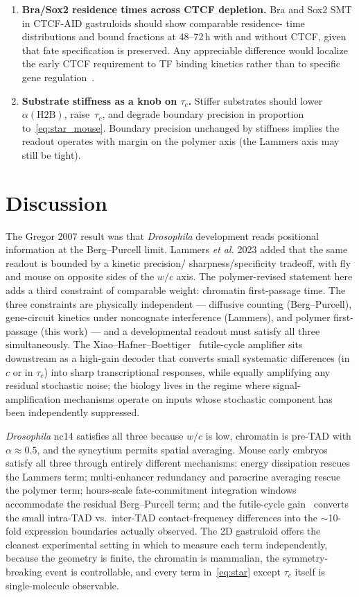 \documentclass[11pt]{article}
\begin{document}
\begin{enumerate}
  \item \textbf{Bra/Sox2 residence times across CTCF depletion.} Bra and
        Sox2 SMT in CTCF-AID gastruloids should show comparable residence-
        time distributions and bound fractions at 48--72\,h with and
        without CTCF, given that fate specification is preserved. Any
        appreciable difference would localize the early CTCF requirement
        to TF binding kinetics rather than to specific gene
        regulation~\cite{Saiz2026}.

  \item \textbf{Substrate stiffness as a knob on $\tau_c$.} Stiffer
        substrates should lower~$\alpha(\mathrm{H2B})$, raise~$\tau_c$, and
        degrade boundary precision in proportion to~\eqref{eq:star_mouse}.
        Boundary precision unchanged by stiffness implies the readout
        operates with margin on the polymer axis (the Lammers axis may still
        be tight).
\end{enumerate}

\section{Discussion}

The Gregor 2007 result was that \textit{Drosophila} development reads
positional information at the Berg--Purcell limit. Lammers \textit{et al.}
2023 added that the same readout is bounded by a kinetic precision/
sharpness/specificity tradeoff, with fly and mouse on opposite sides of the
$w/c$ axis. The polymer-revised statement here adds a third constraint of
comparable weight: chromatin first-passage time. The three constraints are
physically independent --- diffusive counting (Berg--Purcell), gene-circuit
kinetics under noncognate interference (Lammers), and polymer first-passage
(this work) --- and a developmental readout must satisfy all three
simultaneously. The Xiao--Hafner--Boettiger~\cite{Xiao2021} futile-cycle
amplifier sits downstream as a high-gain decoder that converts small
systematic differences (in $c$ or in $\tau_c$) into sharp transcriptional
responses, while equally amplifying any residual stochastic noise; the
biology lives in the regime where signal-amplification mechanisms operate
on inputs whose stochastic component has been independently suppressed.

\textit{Drosophila} nc14 satisfies all three because $w/c$ is low,
chromatin is pre-TAD with $\alpha\!\approx\!0.5$, and the syncytium permits
spatial averaging. Mouse early embryos satisfy all three through entirely
different mechanisms: energy dissipation rescues the Lammers term;
multi-enhancer redundancy and paracrine averaging rescue the polymer term;
hours-scale fate-commitment integration windows accommodate the residual
Berg--Purcell term; and the futile-cycle gain~\cite{Xiao2021} converts the
small intra-TAD vs.\ inter-TAD contact-frequency differences into the
$\sim$10-fold expression boundaries actually observed. The 2D gastruloid
offers the cleanest experimental setting in which to measure each term
independently, because the geometry is finite, the chromatin is mammalian,
the symmetry-breaking event is controllable, and every term
in~\eqref{eq:star} except $\tau_c$ itself is single-molecule observable.
\end{document}
